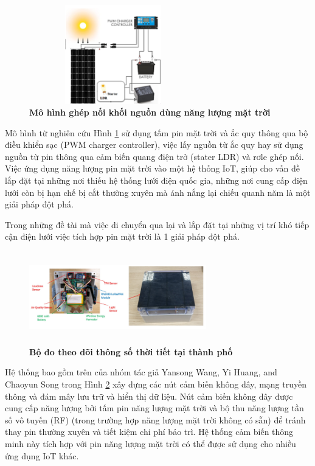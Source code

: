 \documentclass{article} %
\begin{document}
	\begin{figure}[!ht]
		\centering
		\includegraphics[width=7.3cm,height=4.3cm]{Images/ghepnoimt.png}
		\caption[ Mô hình ghép nối khối nguồn dùng năng lượng mặt trời \cite{el2023developed}]{\bfseries \fontsize{12pt}{0pt}\selectfont Mô hình ghép nối khối nguồn dùng năng lượng mặt trời \cite{el2023developed}}
		\label{ghepnoimt}
	\end{figure}
	
	Mô hình từ nghiên cứu Hình \ref{ghepnoimt} \cite{el2023developed} sử dụng tấm pin mặt trời và ắc quy thông qua bộ điều khiển sạc (PWM charger controller), việc lấy nguồn từ ắc quy hay sử dụng nguồn từ pin thông qua cảm biến quang điện trở (stater LDR) và rơle ghép nối. Việc ứng dụng năng lượng pin mặt trời vào một hệ thống IoT, giúp cho vấn đề lắp đặt tại những nơi thiếu hệ thống lưới điện quốc gia, những nơi cung cấp điện lưới còn bị hạn chế bị cắt thường xuyên mà ánh nắng lại chiếu quanh năm là một giải pháp đột phá.
	
	Trong những đề tài mà việc di chuyển qua lại và lắp đặt tại những vị trí khó tiếp cận điện lưới việc tích hợp pin mặt trời là 1 giải pháp đột phá.
	
	\begin{figure}[!ht]
		\centering
		\includegraphics[width=7.7cm,height=4cm]{Images/htthoitiet.png}
		\caption[ Bộ đo theo dõi thông số thời tiết tại thành phố\cite{wang2019new}]{\bfseries \fontsize{12pt}{0pt}\selectfont Bộ đo theo dõi thông số thời tiết tại thành phố\cite{wang2019new}}
		\label{htthoitiet}
	\end{figure}
	
	Hệ thống bao gồm trên của nhóm tác giả Yansong Wang, Yi Huang, and Chaoyun Song \cite{wang2019new} trong Hình \ref{htthoitiet} xây dựng các nút cảm biến không dây, mạng truyền thông và đám mây lưu trữ và hiển thị dữ liệu. Nút cảm biến không dây được cung cấp năng lượng bởi tấm pin năng lượng mặt trời và bộ thu năng lượng tần số vô tuyến (RF) (trong trường hợp năng lượng mặt trời không có sẵn) để tránh thay pin thường xuyên và tiết kiệm chi phí bảo trì. Hệ thống cảm biến thông minh này tích hợp với pin năng lượng mặt trời có thể được sử dụng cho nhiều ứng dụng IoT khác.
	
\end{document}

